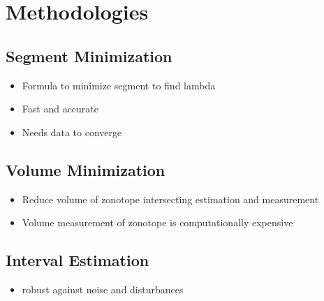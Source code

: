 \chapter{Methodologies} \label{ch:methodologies}
\section{Segment Minimization}
\begin{itemize}
\item{Formula to minimize segment to find lambda}
\item{Fast and accurate}
\item{Needs data to converge}
\end{itemize}
\section{Volume Minimization}
\begin{itemize}
\item{Reduce volume of zonotope intersecting estimation and measurement}
\item{Volume measurement of zonotope is computationally expensive}
\end{itemize}
\section{Interval Estimation}
\begin{itemize}
\item{robust against noise and disturbances}
\end{itemize}
